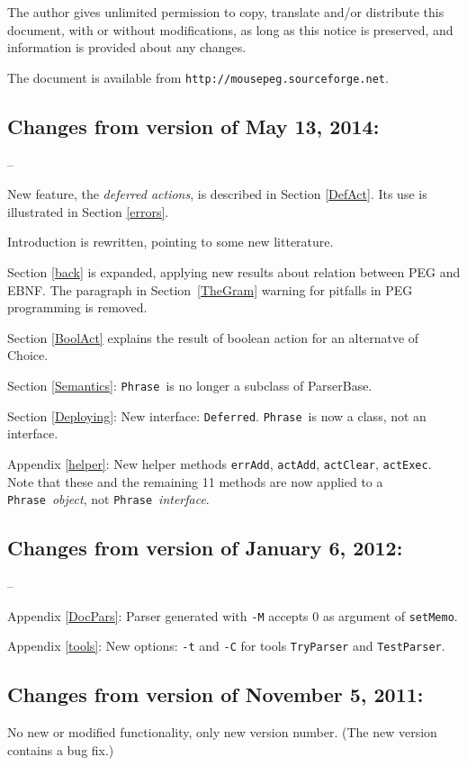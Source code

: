 \documentclass[a4paper,fleqn]{article}
\newcommand{\Phrase}{\tx{Phrase}}
\newcommand{\tx}[1]{\texttt{#1}}
\newcommand{\ul}
{\begin{list}
{--}
 {\setlength{\topsep}{0.5ex}
  \setlength{\itemsep}{0ex}
  \setlength{\parsep}{0ex}
  \setlength{\itemindent}{0em}
  \setlength{\labelwidth}{1em}
  \setlength{\labelsep}{0.5em}
  \setlength{\leftmargin}{1.5em}
 }
}
\newcommand{\eul}{\end{list}}
\begin{document}
\noindent
The author gives unlimited permission to copy, translate and/or distribute
this document, with or without modifications, 
as long as this notice is preserved,
and information is provided about any changes.

\noindent
The document is available from \tx{http://mousepeg.sourceforge.net}.
\newpage
\tableofcontents

\newpage
{}
\subsection*{Changes from version of May 13, 2014:}
\ul
\item New feature, the \textit{deferred actions}, is described in Section \ref{DefAct}.
      Its use is illustrated in  Section \ref{errors}.
\item Introduction is rewritten, pointing to some new litterature.
\item Section \ref{back} is expanded, applying new results about relation between PEG and EBNF.\newline
      The paragraph in Section~\ref{TheGram} warning for pitfalls in PEG programming is removed.
\item Section \ref{BoolAct} explains the result of boolean action for an alternatve of Choice.
\item Section \ref{Semantics}: \Phrase\ is no longer a subclass of ParserBase.
\item Section \ref{Deploying}: New interface: \tx{Deferred}. \Phrase\ is now a class, not an interface.
\item Appendix \ref{helper}: New helper methods \tx{errAdd}, \tx{actAdd}, \tx{actClear}, \tx{actExec}.\newline
      Note that these and the remaining 11 methods are now applied to a \Phrase\ \textit{object},\newline
      not \Phrase\ \textit{interface}.
\eul
\subsection*{Changes from version of January 6, 2012:}
\ul
\item Appendix \ref{DocPars}: Parser generated with \tx{-M} accepts 0 as argument of \tx{setMemo}.
\item Appendix \ref{tools}: New options: \tx{-t} and \tx{-C}
      for tools \tx{TryParser} and \tx{TestParser}.
\eul
\subsection*{Changes from version of November 5, 2011:}
No new or modified functionality, only new version number.
(The new version contains a bug fix.)
\end{document}
